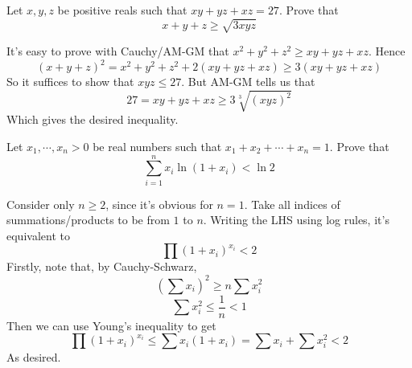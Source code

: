 \documentclass[11pt]{scrartcl}
\begin{document}
\begin{example}
  [Macedonia 2021]
  Let $x,y,z$ be positive reals such that $xy+yz+xz=27$. Prove that
  $$x+y+z\ge \sqrt{3xyz}$$
\end{example}
\begin{soln}
  It's easy to prove with Cauchy/AM-GM that $x^2+y^2+z^2\ge xy+yz+xz$.
  Hence
  $$(x+y+z)^2=x^2+y^2+z^2+2(xy+yz+xz)\ge 3(xy+yz+xz)$$
  So it suffices to show that $xyz\le 27$. But AM-GM tells us that
  $$27=xy+yz+xz\ge 3\sqrt[3]{(xyz)^2}$$
  Which gives the desired inequality.
\end{soln}
\begin{example}
  [Crux 4698]
  Let $x_1,\cdots,x_n>0$ be real numbers such that $x_1+x_2+\cdots+x_n=1$. Prove that
  $$\sum_{i=1}^{n}x_i\ln(1+x_i)<\ln 2$$
\end{example}
\begin{soln}
  Consider only $n\ge 2$, since it's obvious for $n=1$.
  Take all indices of summations/products to be from $1$ to $n$. Writing the LHS using log rules, it's equivalent to
  $$\prod (1+x_i)^{x_i}<2$$
  Firstly, note that, by Cauchy-Schwarz,
  $$\left(\sum x_i\right)^2\ge n\sum x_i^2$$
  $$\sum x_i^2\le \frac{1}{n}<1$$
  Then we can use Young's inequality to get
  $$\prod (1+x_i)^{x_i}\le \sum x_i(1+x_i)=\sum x_i+\sum x_i^2<2$$
  As desired.
\end{soln}
\end{document}
